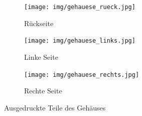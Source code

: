 \par
\begin{figure}[h!tb]
	\centering
	\begin{subfigure}[b]{0.3\linewidth}
		\texttt{[image: img/gehauese\_rueck.jpg]}
		\caption[Rückseite]{Rückseite}
		\label{printet_parts_back}
	\end{subfigure}
	\begin{subfigure}[b]{0.3\linewidth}
		\texttt{[image: img/gehauese\_links.jpg]}
		\caption[Linke Seite]{Linke Seite}
		\label{printet_parts_left}
	\end{subfigure}
	\begin{subfigure}[b]{0.3\linewidth}
		\texttt{[image: img/gehauese\_rechts.jpg]}
		\caption[Rechte Seite]{Rechte Seite}
		\label{printet_parts_right}
	\end{subfigure}
	\caption[Ausgedruckte Teile des Gehäuses]{Ausgedruckte Teile des Gehäuses}
	\label{fig:printet_parts}
\end{figure}
\par
